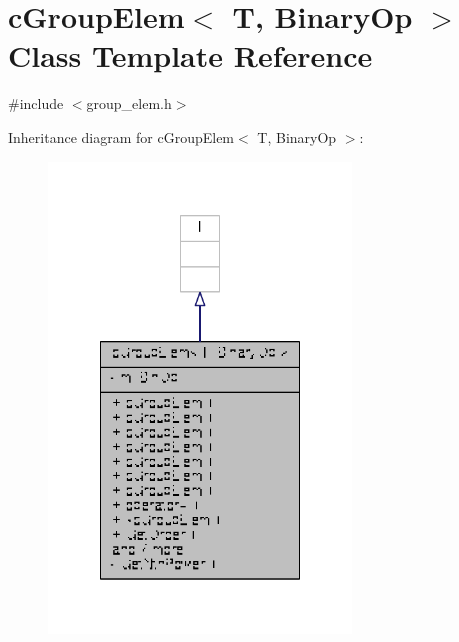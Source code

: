 \hypertarget{classcGroupElem}{\section{c\-Group\-Elem$<$ T, Binary\-Op $>$ Class Template Reference}
\label{classcGroupElem}
}


{\ttfamily \#include $<$group\-\_\-elem.\-h$>$}



Inheritance diagram for c\-Group\-Elem$<$ T, Binary\-Op $>$\-:
\nopagebreak
\begin{figure}[H]
\begin{center}
\leavevmode
\includegraphics[width=228pt]{classcGroupElem__inherit__graph}
\end{center}
\end{figure}


